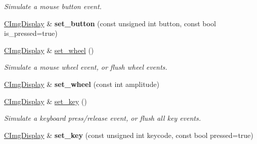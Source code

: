 \begin{DoxyCompactItemize}
\begin{DoxyCompactList}\small\item\em Simulate a mouse button event. \item\end{DoxyCompactList}\item 
\hypertarget{structcimg__library_1_1CImgDisplay_aa8fc0d8a39b2063d9f1f6cea8fcc2cfb}{
\hyperlink{structcimg__library_1_1CImgDisplay}{CImgDisplay} \& {\bfseries set\_\-button} (const unsigned int button, const bool is\_\-pressed=true)}
\label{structcimg__library_1_1CImgDisplay_aa8fc0d8a39b2063d9f1f6cea8fcc2cfb}

\item 
\hypertarget{structcimg__library_1_1CImgDisplay_a1a255a5404da7ba5b511c23cefa91879}{
\hyperlink{structcimg__library_1_1CImgDisplay}{CImgDisplay} \& \hyperlink{structcimg__library_1_1CImgDisplay_a1a255a5404da7ba5b511c23cefa91879}{set\_\-wheel} ()}
\label{structcimg__library_1_1CImgDisplay_a1a255a5404da7ba5b511c23cefa91879}

\begin{DoxyCompactList}\small\item\em Simulate a mouse wheel event, or flush wheel events. \item\end{DoxyCompactList}\item 
\hypertarget{structcimg__library_1_1CImgDisplay_a90e0d424e65ccc6dba2a0df2e5886759}{
\hyperlink{structcimg__library_1_1CImgDisplay}{CImgDisplay} \& {\bfseries set\_\-wheel} (const int amplitude)}
\label{structcimg__library_1_1CImgDisplay_a90e0d424e65ccc6dba2a0df2e5886759}

\item 
\hypertarget{structcimg__library_1_1CImgDisplay_a199046786d132551afa204c8b80eddc1}{
\hyperlink{structcimg__library_1_1CImgDisplay}{CImgDisplay} \& \hyperlink{structcimg__library_1_1CImgDisplay_a199046786d132551afa204c8b80eddc1}{set\_\-key} ()}
\label{structcimg__library_1_1CImgDisplay_a199046786d132551afa204c8b80eddc1}

\begin{DoxyCompactList}\small\item\em Simulate a keyboard press/release event, or flush all key events. \item\end{DoxyCompactList}\item 
\hypertarget{structcimg__library_1_1CImgDisplay_ae4bcb80bf4c19ff9c41a0821754148b6}{
\hyperlink{structcimg__library_1_1CImgDisplay}{CImgDisplay} \& {\bfseries set\_\-key} (const unsigned int keycode, const bool pressed=true)}
\label{structcimg__library_1_1CImgDisplay_ae4bcb80bf4c19ff9c41a0821754148b6}


\end{DoxyCompactItemize}
